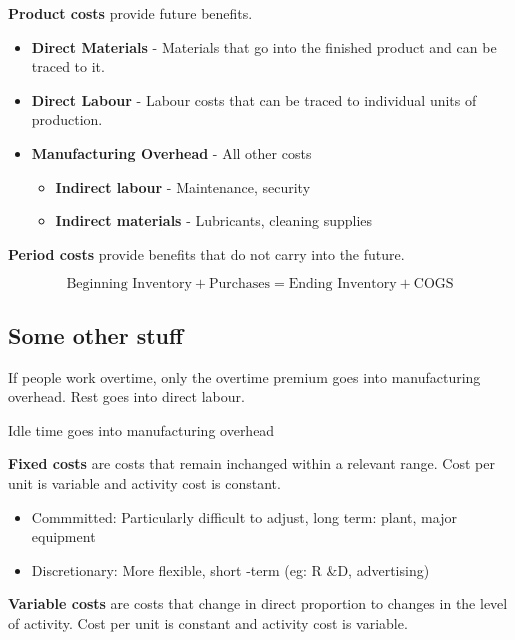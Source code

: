 \documentclass[english, 12pt]{article}
\begin{document}
\begin{defn}
\textbf{Product costs} provide future benefits.
\begin{itemize}
\item \textbf{Direct Materials} - Materials that go into the finished product and can be traced to it.
\item \textbf{Direct Labour} - Labour costs that can be traced to individual units of production.
\item \textbf{Manufacturing Overhead} - All other costs
\begin{itemize}
\item \textbf{Indirect labour} - Maintenance, security
\item \textbf{Indirect materials} - Lubricants, cleaning supplies
\end{itemize}
\end{itemize}
\end{defn}
\begin{defn}
\textbf{Period costs} provide benefits that do not carry into the future.
\end{defn}
\[ \text{Beginning Inventory} + \text{Purchases} = \text{Ending Inventory} + \text{COGS}\]


\subsection{Some other stuff}
If people work overtime, only the overtime premium goes into manufacturing overhead. Rest goes into direct labour.
\begin{note}
Idle time goes into manufacturing overhead
\end{note}
\begin{defn}
\textbf{Fixed costs} are costs that remain inchanged within a relevant range. Cost per unit is variable and activity cost is constant.
\begin{itemize}
\item Commmitted: Particularly difficult to adjust, long term: plant, major equipment
\item Discretionary: More flexible, short -term (eg: R \&D, advertising)
\end{itemize}

\end{defn}


\begin{defn}
\textbf{Variable costs} are  costs that change in direct proportion to changes in the level of activity. Cost per unit is constant and activity cost is variable.
\end{defn}
\end{document}
